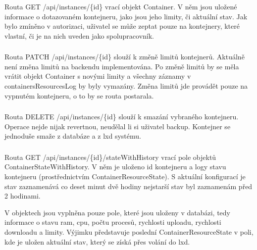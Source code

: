 \documentclass[a4paper,oneside,12pt]{report}
\begin{document}
\subsubsection{}

Routa GET /api/instances/\{id\} vrací objekt Container.
V něm jsou uložené informace o dotazovaném kontejneru, jako jsou jeho limity, či aktuální stav.
Jak bylo zmíněno v autorizaci, uživatel se může zeptat pouze na kontejnery, které vlastní, či je na nich uveden jako spolupracovník.

\subsubsection{}

Routa PATCH /api/instances/\{id\} slouží k změně limitů kontejnerů.
Aktuálně není změna limitů na backendu implementována.
Po změně limitů by se měla vrátit objekt Container s novými limity a všechny záznamy v containersResourcesLog by byly vymazány.
Změna limitů jde provádět pouze na vypnutém kontejneru, o to by se routa postarala.

\subsubsection{}

Routa DELETE /api/instances/\{id\} slouží k smazání vybraného kontejneru.
Operace nejde nijak revertnou, neudělal li si uživatel backup.
Kontejner se jednoduše smaže z databáze a z lxd systému.

\subsubsection{}

Routa GET /api/instances/\{id\}/stateWithHistory vrací pole objektů ContainerStateWithHistory.
V něm je uloženo id kontejneru a logy stavu kontejneru (prostřednictvím ContainerResourceState).
S aktuální konfigurací je stav zaznamenává co deset minut dvě hodiny nejstarší stav byl zaznamenám před 2 hodinami.

V objektech jsou vyplněna pouze pole, které jsou uloženy v databázi, tedy informace o stavu ram, cpu, počtu procesů, rychlosti uploadu, rychlosti downloadu a limity.
Výjimku představuje poslední ContainerResourceState v poli, kde je uložen aktuální stav, který se získá přes volání do lxd.
\end{document}
